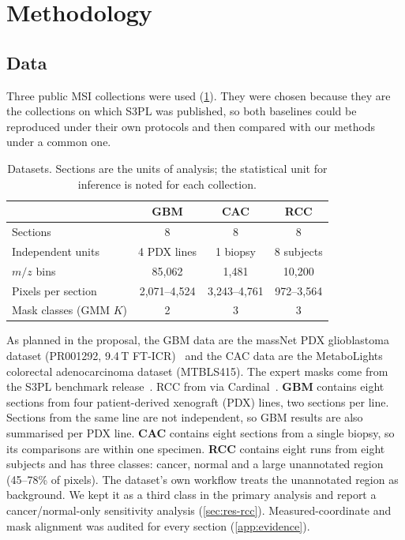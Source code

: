 \section{Methodology}
\label{sec:methodology}

\subsection{Data}
\label{sec:data}
Three public MSI collections were used (\cref{tab:data}). They were chosen
because they are the collections on which S3PL was published, so both
baselines could be reproduced under their own protocols and then compared with
our methods under a common one.

\begin{table}[t]
\caption{Datasets. Sections are the units of analysis; the statistical unit for
inference is noted for each collection.}
\label{tab:data}
\centering\small
\begin{tabular}{@{}lccc@{}}
\toprule
 & GBM & CAC & RCC \\
\midrule
Sections & 8 & 8 & 8 \\
Independent units & 4 PDX lines & 1 biopsy & 8 subjects \\
$m/z$ bins & 85{,}062 & 1{,}481 & 10{,}200 \\
Pixels per section & 2{,}071--4{,}524 & 3{,}243--4{,}761 & 972--3{,}564 \\
Mask classes (GMM $K$) & 2 & 3 & 3 \\
\bottomrule
\end{tabular}
\end{table}

As planned in the proposal, the GBM data are the massNet PDX glioblastoma
dataset (PR001292, 9.4\,T FT-ICR)~\citep{abdelmoula2022massnet} and the CAC data
are the MetaboLights colorectal adenocarcinoma dataset
(MTBLS415). The expert masks come from
the S3PL benchmark release~\citep{weigand2026spatial}. RCC from \citet{dill2010rcc} via Cardinal~\citep{bemis2015cardinal}.
\textbf{GBM} contains eight sections from four patient-derived xenograft (PDX)
lines, two sections per line. Sections from the same line are not
independent, so GBM results are also summarised per PDX line.
\textbf{CAC} contains eight sections from a single biopsy, so its comparisons
are within one specimen. \textbf{RCC} contains eight runs from eight subjects
and has three classes: cancer, normal and a large unannotated region (45--78\%
of pixels). The dataset's own workflow treats the unannotated region as
background. We kept it as a third class in the primary analysis and report a
cancer/normal-only sensitivity analysis (\cref{sec:res-rcc}).
Measured-coordinate and mask alignment was audited for every section
(\cref{app:evidence}).

